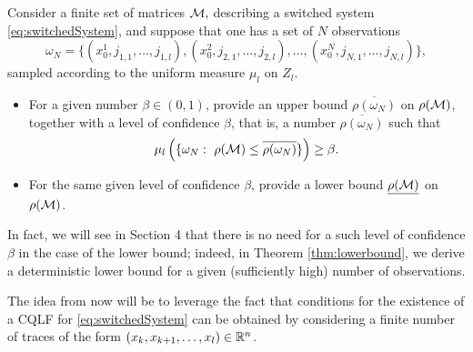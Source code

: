 \begin{problem} 
Consider a finite set of matrices $\mathcal{M},$ describing a switched system \eqref{eq:switchedSystem}, and suppose that one has a set of $N$ observations $$\omega_N=\{(x_0^1, j_{1,1}, \dots, j_{1,l}), (x_0^2, j_{2,1}, \dots, j_{2,l}), \ldots, (x_0^N, j_{N,1},\dots, j_{N,l})\},$$ sampled according to the uniform measure $\mu_l$ on $Z_l$.

\begin{itemize}
\item For a given number $\beta \in (0,1)$, provide an upper bound $\overline{\rho(\omega_N)}$ on $\rho(\mathcal{M})$, together with a level of confidence $\beta$, that is, a number $\overline{\rho(\omega_N)}$ such that $$\mu_l \left( \{\omega_N: \ \rho(\cM) \leq \overline{\rho(\omega_N)} \} \right) \geq \beta. $$
 
\item For the same given level of confidence $\beta$, provide a lower bound $\underline{\rho(\mathcal{M})}$ on $\rho(\mathcal{M})$.
\end{itemize}
\end{problem}

In fact, we will see in Section 4 that there is no need for a such level of confidence $\beta$ in the case of the lower bound; indeed, in Theorem  \ref{thm:lowerbound}, we derive a deterministic lower bound for a given (sufficiently high) number of observations. 

The idea from now will be to leverage the fact that conditions for the existence of a CQLF for \eqref{eq:switchedSystem} can be obtained by considering a finite number of traces of the form $(x_k,x_{k+1}, \dots, x_{l}) \in \mathbb{R}^n$.